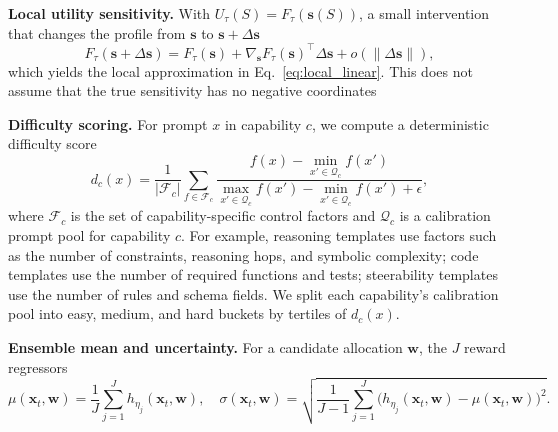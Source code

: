 \textbf{Local utility sensitivity.} With $U_\tau(S)=F_\tau(\mathbf{s}(S))$, a small intervention that changes the profile from $\mathbf{s}$ to $\mathbf{s}+\Delta\mathbf{s}$ 
\begin{equation}
F_\tau(\mathbf{s}+\Delta\mathbf{s})
=
F_\tau(\mathbf{s})+
\nabla_{\mathbf{s}}F_\tau(\mathbf{s})^\top\Delta\mathbf{s}
+o(\|\Delta\mathbf{s}\|),
\label{eq:taylor}
\end{equation}
which yields the local approximation in Eq.~\eqref{eq:local_linear}. This does not assume that the true sensitivity has no negative coordinates

\textbf{Difficulty scoring.} For prompt $x$ in capability $c$, we compute a deterministic difficulty score
\begin{equation}
d_c(x)=\frac{1}{|\mathcal{F}_c|}\sum_{f\in\mathcal{F}_c}
\frac{f(x)-\min_{x'\in\mathcal{Q}_c} f(x')}
{\max_{x'\in\mathcal{Q}_c} f(x')-\min_{x'\in\mathcal{Q}_c} f(x')+\epsilon},
\label{eq:difficulty_score}
\end{equation}
where $\mathcal{F}_c$ is the set of capability-specific control factors and $\mathcal{Q}_c$ is a calibration prompt pool for capability $c$. For example, reasoning templates use factors such as the number of constraints, reasoning hops, and symbolic complexity; code templates use the number of required functions and tests; steerability templates use the number of rules and schema fields. We split each capability's calibration pool into easy, medium, and hard buckets by tertiles of $d_c(x)$.

\textbf{Ensemble mean and uncertainty.} For a candidate allocation $\mathbf{w}$, the $J$ reward regressors 
\begin{equation}
\mu(\mathbf{x}_t,\mathbf{w})=\frac{1}{J}\sum_{j=1}^J h_{\eta_j}(\mathbf{x}_t,\mathbf{w}),
\quad
\sigma(\mathbf{x}_t,\mathbf{w})=
\sqrt{\frac{1}{J-1}\sum_{j=1}^J\big(h_{\eta_j}(\mathbf{x}_t,\mathbf{w})-\mu(\mathbf{x}_t,\mathbf{w})\big)^2}.
\label{eq:ensemble_mu_sigma}
\end{equation}

